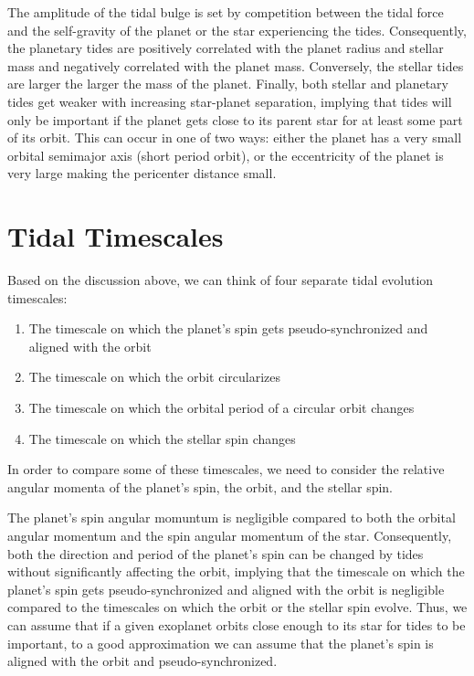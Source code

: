 The amplitude of the tidal bulge is set by competition between the tidal force
and the self-gravity of the planet or the star experiencing the tides.
Consequently, the planetary tides are positively correlated with the planet
radius and stellar mass and negatively correlated with the planet mass.
Conversely, the stellar tides are larger the larger the mass of the planet.
Finally, both stellar and planetary tides get weaker with increasing
star-planet separation, implying that tides will only be important if the planet
gets close to its parent star for at least some part of its orbit. This can
occur in one of two ways: either the planet has a very small orbital semimajor
axis (short period orbit), or the eccentricity of the planet is very large
making the pericenter distance small.

\section{Tidal Timescales}

Based on the discussion above, we can think of four separate tidal evolution
timescales:

\begin{enumerate}
%
    \item The timescale on which the planet's spin gets pseudo-synchronized and
        aligned with the orbit
%
    \item The timescale on which the orbit circularizes
%
    \item The timescale on which the orbital period of a circular orbit changes
%
    \item The timescale on which the stellar spin changes
%
\end{enumerate}

In order to compare some of these timescales, we need to consider the relative
angular momenta of the planet's spin, the orbit, and the stellar spin.

The planet's spin angular momuntum is negligible compared to both the orbital
angular momentum and the spin angular momentum of the star.  Consequently, both
the direction and period of the planet's spin can be changed by tides without
significantly affecting the orbit, implying that the timescale on which the
planet's spin gets pseudo-synchronized and aligned with the orbit is negligible
compared to the timescales on which the orbit or the stellar spin evolve. Thus,
we can assume that if a given exoplanet orbits close enough to its star for
tides to be important, to a good approximation we can assume that the planet's
spin is aligned with the orbit and pseudo-synchronized.

